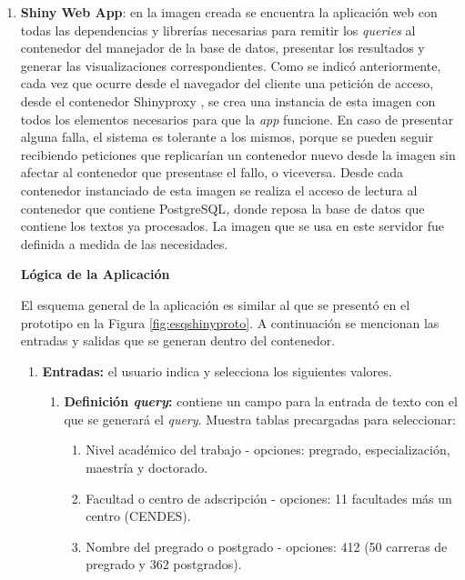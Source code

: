 \documentclass[
  12pt,
  openany]{book}
\begin{document}
\begin{enumerate}
\item
  \textbf{Shiny Web App}: en la imagen creada se encuentra la aplicación web con todas las dependencias y librerías necesarias para remitir los \emph{queries} al contenedor del manejador de la base de datos, presentar los resultados y generar las visualizaciones correspondientes. Como se indicó anteriormente, cada vez que ocurre desde el navegador del cliente una petición de acceso, desde el contenedor Shinyproxy , se crea una instancia de esta imagen con todos los elementos necesarios para que la \emph{app} funcione. En caso de presentar alguna falla, el sistema es tolerante a los mismos, porque se pueden seguir recibiendo peticiones que replicarían un contenedor nuevo desde la imagen sin afectar al contenedor que presentase el fallo, o viceversa. Desde cada contenedor instanciado de esta imagen se realiza el acceso de lectura al contenedor que contiene PostgreSQL\emph{,} donde reposa la base de datos que contiene los textos ya procesados. La imagen que se usa en este servidor fue definida a medida de las necesidades.

  \textbf{Lógica de la Aplicación}

  El esquema general de la aplicación es similar al que se presentó en el prototipo en la Figura \ref{fig:esqshinyproto}. A continuación se mencionan las entradas y salidas que se generan dentro del contenedor.

  \begin{enumerate}
  \def\labelenumii{\arabic{enumii}.}
  \item
    \textbf{Entradas:} el usuario indica y selecciona los siguientes valores.

    \begin{enumerate}
    \def\labelenumiii{\roman{enumiii}.}
    \item
      \textbf{Definición \emph{query}:} contiene un campo para la entrada de texto con el que se generará el \emph{query}. Muestra tablas precargadas para seleccionar:

      \begin{enumerate}
      \def\labelenumiv{\arabic{enumiv})}
      \item
        Nivel académico del trabajo - opciones: pregrado, especialización, maestría y doctorado.
      \item
        Facultad o centro de adscripción - opciones: 11 facultades más un centro (CENDES).
      \item
        Nombre del pregrado o postgrado - opciones: 412 (50 carreras de pregrado y 362 postgrados).
      \end{enumerate}


\end{enumerate}
\end{enumerate}
\end{enumerate}
\end{document}
